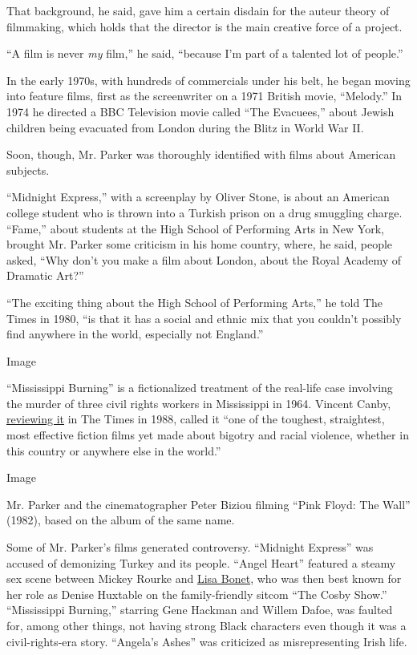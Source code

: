 That background, he said, gave him a certain disdain for the auteur
theory of filmmaking, which holds that the director is the main creative
force of a project.

``A film is never \emph{my} film,'' he said, ``because I'm part of a
talented lot of people.''

In the early 1970s, with hundreds of commercials under his belt, he
began moving into feature films, first as the screenwriter on a 1971
British movie, ``Melody.'' In 1974 he directed a BBC Television movie
called ``The Evacuees,'' about Jewish children being evacuated from
London during the Blitz in World War II.

Soon, though, Mr. Parker was thoroughly identified with films about
American subjects.

``Midnight Express,'' with a screenplay by Oliver Stone, is about an
American college student who is thrown into a Turkish prison on a drug
smuggling charge. ``Fame,'' about students at the High School of
Performing Arts in New York, brought Mr. Parker some criticism in his
home country, where, he said, people asked, ``Why don't you make a film
about London, about the Royal Academy of Dramatic Art?''

``The exciting thing about the High School of Performing Arts,'' he told
The Times in 1980, ``is that it has a social and ethnic mix that you
couldn't possibly find anywhere in the world, especially not England.''

Image

``Mississippi Burning'' is a fictionalized treatment of the real-life
case involving the murder of three civil rights workers in Mississippi
in 1964. Vincent Canby,
\href{https://www.nytimes.com/1988/12/09/movies/review-film-retracing-mississippi-s-agony-1964.html}{reviewing
it} in The Times in 1988, called it ``one of the toughest, straightest,
most effective fiction films yet made about bigotry and racial violence,
whether in this country or anywhere else in the world.''

Image

Mr. Parker and the cinematographer Peter Biziou filming ``Pink Floyd:
The Wall'' (1982), based on the album of the same name.

Some of Mr. Parker's films generated controversy. ``Midnight Express''
was accused of demonizing Turkey and its people. ``Angel Heart''
featured a steamy sex scene between Mickey Rourke and
\href{https://decider.com/2019/10/03/angel-heart-walter-chaw/}{Lisa
Bonet}, who was then best known for her role as Denise Huxtable on the
family-friendly sitcom ``The Cosby Show.'' ``Mississippi Burning,''
starring Gene Hackman and Willem Dafoe, was faulted for, among other
things, not having strong Black characters even though it was a
civil-rights-era story. ``Angela's Ashes'' was criticized as
misrepresenting Irish life.

